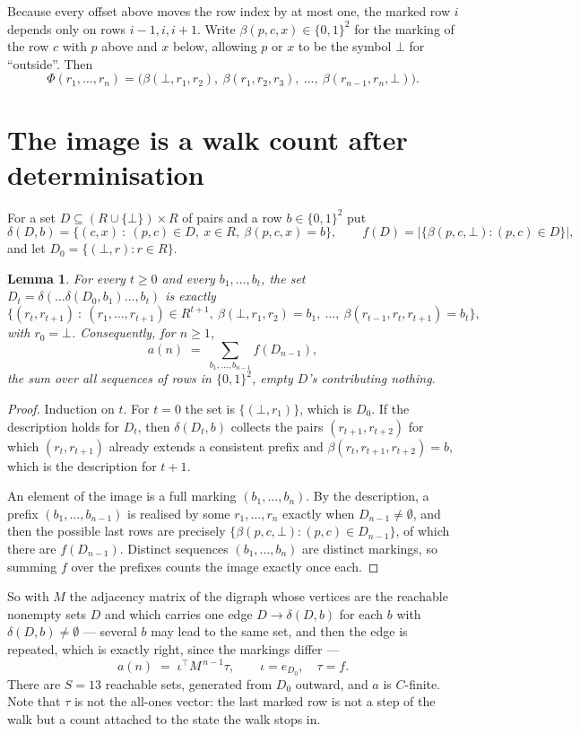 \documentclass[11pt,a4paper]{article}
\theoremstyle{plain}
\newtheorem{lemma}[theorem]{Lemma}
\theoremstyle{definition}
\begin{document}
Because every offset above moves the row index by at most one, the marked row $i$ depends only
on rows $i-1,i,i+1$. Write $\beta(p,c,x)\in\{0,1\}^{2}$ for the marking of the row $c$
with $p$ above and $x$ below, allowing $p$ or $x$ to be the symbol $\bot$ for ``outside''.
Then
\[
\Phi(r_1,\dots,r_n)=\bigl(\beta(\bot,r_1,r_2),\ \beta(r_1,r_2,r_3),\ \dots,\
\beta(r_{n-1},r_n,\bot)\bigr).
\]

\section{The image is a walk count after determinisation}

For a set $D\subseteq(R\cup\{\bot\})\times R$ of pairs and a row $b\in\{0,1\}^{2}$ put
\[
\delta(D,b)=\{(c,x)\ :\ (p,c)\in D,\ x\in R,\ \beta(p,c,x)=b\},\qquad
f(D)=\bigl|\{\beta(p,c,\bot):(p,c)\in D\}\bigr| ,
\]
and let $D_0=\{(\bot,r):r\in R\}$.

\begin{lemma}\label{lem:det}
For every $t\ge0$ and every $b_1,\dots,b_t$, the set
$D_t=\delta(\dots\delta(D_0,b_1)\dots,b_t)$ is exactly
\[
\{(r_t,r_{t+1})\ :\ (r_1,\dots,r_{t+1})\in R^{t+1},\ \beta(\bot,r_1,r_2)=b_1,\ \dots,\
\beta(r_{t-1},r_t,r_{t+1})=b_t\} ,
\]
with $r_0=\bot$. Consequently, for $n\ge1$,
\[
a(n)\;=\;\sum_{b_1,\dots,b_{n-1}}f(D_{n-1}),
\]
the sum over all sequences of rows in $\{0,1\}^{2}$, empty $D$'s contributing nothing.
\end{lemma}

\begin{proof}
Induction on $t$. For $t=0$ the set is $\{(\bot,r_1)\}$, which is $D_0$. If the description
holds for $D_t$, then $\delta(D_t,b)$ collects the pairs $(r_{t+1},r_{t+2})$ for which
$(r_t,r_{t+1})$ already extends a consistent prefix and
$\beta(r_t,r_{t+1},r_{t+2})=b$, which is the description for $t+1$.

An element of the image is a full marking $(b_1,\dots,b_n)$. By the description, a prefix
$(b_1,\dots,b_{n-1})$ is realised by some $r_1,\dots,r_n$ exactly when $D_{n-1}\neq
\emptyset$, and then the possible last rows are precisely
$\{\beta(p,c,\bot):(p,c)\in D_{n-1}\}$, of which there are $f(D_{n-1})$. Distinct
sequences $(b_1,\dots,b_n)$ are distinct markings, so summing $f$ over the prefixes counts the
image exactly once each.
\end{proof}

So with $M$ the adjacency matrix of the digraph whose vertices are the reachable nonempty sets
$D$ and which carries one edge $D\to\delta(D,b)$ for each $b$ with $\delta(D,b)\neq\emptyset$
--- several $b$ may lead to the same set, and then the edge is repeated, which is exactly
right, since the markings differ ---
\[
a(n)\;=\;\iota^{\!\top}M^{\,n-1}\tau,\qquad \iota=e_{D_0},\quad \tau=f .
\]
There are $S=13$ reachable sets, generated from $D_0$ outward, and $a$ is $C$-finite. Note
that $\tau$ is not the all-ones vector: the last marked row is not a step of the walk but a
count attached to the state the walk stops in.
\end{document}
